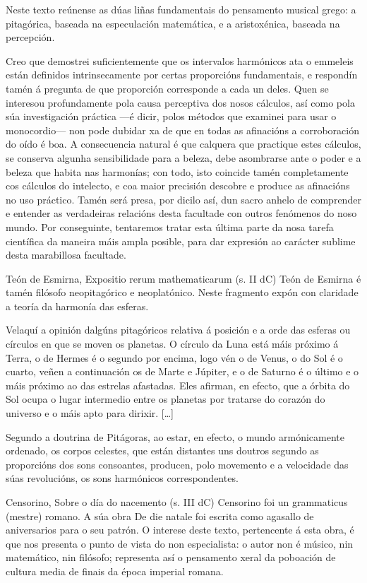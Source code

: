 Neste texto reúnense as dúas liñas fundamentais do pensamento musical grego: a pitagórica, baseada na especulación matemática, e a aristoxénica, baseada na percepción.

Creo que demostrei suficientemente que os intervalos harmónicos ata o emmeleis están definidos intrinsecamente por certas proporcións fundamentais, e respondín tamén á pregunta de que proporción corresponde a cada un deles. Quen se interesou profundamente pola causa perceptiva dos nosos cálculos, así como pola súa investigación práctica —é dicir, polos métodos que examinei para usar o monocordio— non pode dubidar xa de que en todas as afinacións a corroboración do oído é boa. A consecuencia natural é que calquera que practique estes cálculos, se conserva algunha sensibilidade para a beleza, debe asombrarse ante o poder e a beleza que habita nas harmonías; con todo, isto coincide tamén completamente cos cálculos do intelecto, e coa maior precisión descobre e produce as afinacións no uso práctico. Tamén será presa, por dicilo así, dun sacro anhelo de comprender e entender as verdadeiras relacións desta facultade con outros fenómenos do noso mundo. Por conseguinte, tentaremos tratar esta última parte da nosa tarefa científica da maneira máis ampla posible, para dar expresión ao carácter sublime desta marabillosa facultade.

Teón de Esmirna, Expositio rerum mathematicarum (s. II dC)
Teón de Esmirna é tamén filósofo neopitagórico e neoplatónico. Neste fragmento expón con claridade a teoría da harmonía das esferas.

Velaquí a opinión dalgúns pitagóricos relativa á posición e a orde das esferas ou círculos en que se moven os planetas. O círculo da Luna está máis próximo á Terra, o de Hermes é o segundo por encima, logo vén o de Venus, o do Sol é o cuarto, veñen a continuación os de Marte e Júpiter, e o de Saturno é o último e o máis próximo ao das estrelas afastadas. Eles afirman, en efecto, que a órbita do Sol ocupa o lugar intermedio entre os planetas por tratarse do corazón do universo e o máis apto para dirixir. […]

Segundo a doutrina de Pitágoras, ao estar, en efecto, o mundo armónicamente ordenado, os corpos celestes, que están distantes uns doutros segundo as proporcións dos sons consoantes, producen, polo movemento e a velocidade das súas revolucións, os sons harmónicos correspondentes.

Censorino, Sobre o día do nacemento (s. III dC)
Censorino foi un grammaticus (mestre) romano. A súa obra De die natale foi escrita como agasallo de aniversarios para o seu patrón. O interese deste texto, pertencente á esta obra, é que nos presenta o punto de vista do non especialista: o autor non é músico, nin matemático, nin filósofo; representa así o pensamento xeral da poboación de cultura media de finais da época imperial romana.

